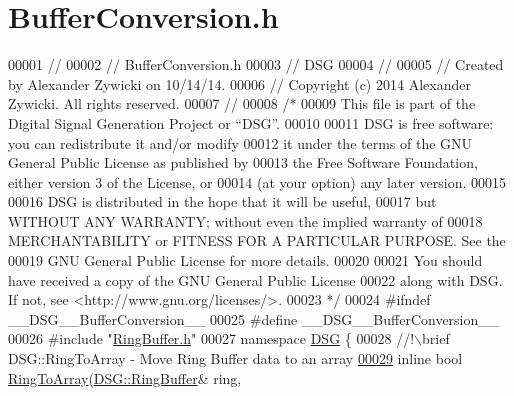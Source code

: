 \hypertarget{_buffer_conversion_8h_source}{\section{Buffer\+Conversion.\+h}
\label{_buffer_conversion_8h_source}
}

\begin{DoxyCode}
00001 \textcolor{comment}{//}
00002 \textcolor{comment}{//  BufferConversion.h}
00003 \textcolor{comment}{//  DSG}
00004 \textcolor{comment}{//}
00005 \textcolor{comment}{//  Created by Alexander Zywicki on 10/14/14.}
00006 \textcolor{comment}{//  Copyright (c) 2014 Alexander Zywicki. All rights reserved.}
00007 \textcolor{comment}{//}
00008 \textcolor{comment}{/*}
00009 \textcolor{comment}{ This file is part of the Digital Signal Generation Project or “DSG”.}
00010 \textcolor{comment}{}
00011 \textcolor{comment}{ DSG is free software: you can redistribute it and/or modify}
00012 \textcolor{comment}{ it under the terms of the GNU General Public License as published by}
00013 \textcolor{comment}{ the Free Software Foundation, either version 3 of the License, or}
00014 \textcolor{comment}{ (at your option) any later version.}
00015 \textcolor{comment}{}
00016 \textcolor{comment}{ DSG is distributed in the hope that it will be useful,}
00017 \textcolor{comment}{ but WITHOUT ANY WARRANTY; without even the implied warranty of}
00018 \textcolor{comment}{ MERCHANTABILITY or FITNESS FOR A PARTICULAR PURPOSE.  See the}
00019 \textcolor{comment}{ GNU General Public License for more details.}
00020 \textcolor{comment}{}
00021 \textcolor{comment}{ You should have received a copy of the GNU General Public License}
00022 \textcolor{comment}{ along with DSG.  If not, see <http://www.gnu.org/licenses/>.}
00023 \textcolor{comment}{ */}
00024 \textcolor{preprocessor}{#ifndef \_\_DSG\_\_BufferConversion\_\_}
00025 \textcolor{preprocessor}{#define \_\_DSG\_\_BufferConversion\_\_}
00026 \textcolor{preprocessor}{#include "\hyperlink{_ring_buffer_8h}{RingBuffer.h}"}
00027 \textcolor{keyword}{namespace }\hyperlink{namespace_d_s_g}{DSG} \{\textcolor{comment}{}
00028 \textcolor{comment}{    //!\(\backslash\)brief DSG::RingToArray - Move Ring Buffer data to an array}
\hypertarget{_buffer_conversion_8h_source_l00029}{}\hyperlink{namespace_d_s_g_a4049a445d7cb9ee4f9140bdfdbd5e11c}{00029} \textcolor{comment}{}    \textcolor{keyword}{inline} \textcolor{keywordtype}{bool} \hyperlink{namespace_d_s_g_a4049a445d7cb9ee4f9140bdfdbd5e11c}{RingToArray}(\hyperlink{class_d_s_g_1_1_ring_buffer}{DSG::RingBuffer}& ring,

\end{DoxyCode}
